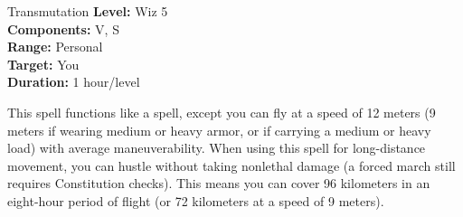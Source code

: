 {Transmutation}
{
	\textbf{Level:}
	Wiz 5\\
	\textbf{Components:}
	V, S\\
	\textbf{Range:}
	Personal\\
	\textbf{Target:}
	You\\
	\textbf{Duration:}
	1 hour/level\\
}
{
	This spell functions like a  spell, except you can fly at a speed of 12 meters (9 meters if wearing medium or heavy armor, or if carrying a medium or heavy load) with average maneuverability. When using this spell for long-distance movement, you can hustle without taking nonlethal damage (a forced march still requires Constitution checks). This means you can cover 96 kilometers in an eight-hour period of flight (or 72 kilometers at a speed of 9 meters).

}
